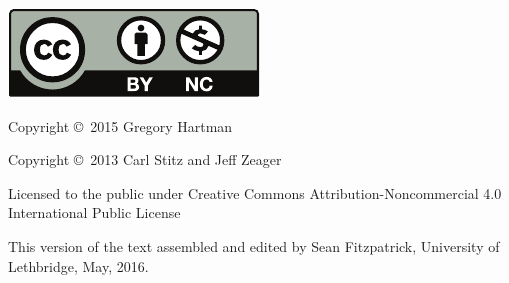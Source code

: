 \noindent\hskip -1in\begin{minipage}{2in}
\includegraphics{text/by-nc} 
\end{minipage}
\begin{minipage}{3in}
\noindent Copyright \copyright\ 2015 Gregory Hartman

\noindent Copyright \copyright\ 2013 Carl Stitz and Jeff Zeager

Licensed to the public under Creative Commons Attribution-Noncommercial 4.0 International Public License
\end{minipage}

\bigskip

\bigskip



\bigskip

This version of the text assembled and edited by Sean Fitzpatrick, University of Lethbridge, May, 2016. 

